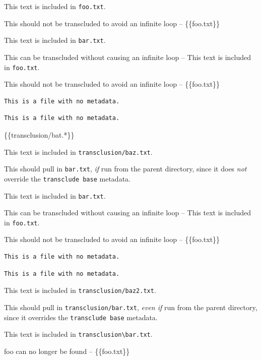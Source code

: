 
\def\mytitle{Transclusion}


This text is included in \texttt{foo.txt}.

This should not be transcluded to avoid an infinite loop -- \{\{foo.txt\}\}

This text is included in \texttt{bar.txt}.

This can be transcluded without causing an infinite loop --
This text is included in \texttt{foo.txt}.

This should not be transcluded to avoid an infinite loop -- \{\{foo.txt\}\}

\begin{verbatim}
This is a file with no metadata.
\end{verbatim}

\begin{verbatim}
This is a file with no metadata.
\end{verbatim}

\{\{transclusion/bat.*\}\}

This text is included in \texttt{transclusion/baz.txt}.

This should pull in \texttt{bar.txt}, \emph{if} run from the parent directory, since it
does \emph{not} override the \texttt{transclude base} metadata.

This text is included in \texttt{bar.txt}.

This can be transcluded without causing an infinite loop --
This text is included in \texttt{foo.txt}.

This should not be transcluded to avoid an infinite loop -- \{\{foo.txt\}\}

\begin{verbatim}
This is a file with no metadata.
\end{verbatim}

\begin{verbatim}
This is a file with no metadata.
\end{verbatim}

This text is included in \texttt{transclusion/baz2.txt}.

This should pull in \texttt{transclusion/bar.txt}, \emph{even if} run from the parent
directory, since it overrides the \texttt{transclude base} metadata.

This text is included in \texttt{transclusion\textbackslash{}bar.txt}.

foo can no longer be found -- \{\{foo.txt\}\}


